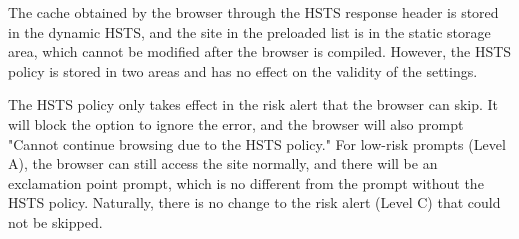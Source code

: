 The cache obtained by the browser through the HSTS response header is stored in the dynamic HSTS, and the site in the preloaded list is in the static storage area, which cannot be modified after the browser is compiled. However, the HSTS policy is stored in two areas and has no effect on the validity of the settings.

The HSTS policy only takes effect in the risk alert that the browser can skip. It will block the option to ignore the error, and the browser will also prompt "Cannot continue browsing due to the HSTS policy." For low-risk prompts (Level A), the browser can still access the site normally, and there will be an exclamation point prompt, which is no different from the prompt without the HSTS policy. Naturally, there is no change to the risk alert (Level C) that could not be skipped.

